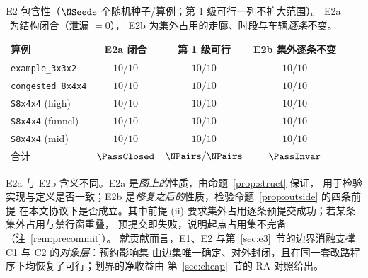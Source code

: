 \begin{table}[t]
\centering
\caption{E2 包含性（\(\NSeeds\) 个随机种子/算例；第 1 级可行一列不扩大范围）。
E2a 为结构闭合（泄漏 \(=0\)），
E2b 为集外占用的走廊、时段与车辆\emph{逐条}不变。}
\label{tab:e2}
\small
\begin{tabular}{@{}lccc@{}}
\toprule
算例 & E2a 闭合 & 第 1 级可行 & E2b 集外逐条不变 \\
\midrule
\texttt{example\_3x3x2}   & \(10/10\) & \(10/10\) & \(10/10\) \\
\texttt{congested\_8x4x4} & \(10/10\) & \(10/10\) & \(10/10\) \\
\texttt{S8x4x4} (high)    & \(10/10\) & \(10/10\) & \(10/10\) \\
\texttt{S8x4x4} (funnel)  & \(10/10\) & \(10/10\) & \(10/10\) \\
\texttt{S8x4x4} (mid)     & \(10/10\) & \(10/10\) & \(10/10\) \\
\midrule
合计 & \(\PassClosed\) & \(\NPairs/\NPairs\) & \(\PassInvar\) \\
\bottomrule
\end{tabular}
\end{table}

E2a 与 E2b 含义不同。E2a 是\emph{图上的}性质，由命题~\ref{prop:struct} 保证，
用于检验实现与定义是否一致；E2b 是\emph{修复之后的}性质，检验命题~\ref{prop:outside} 的四条前提
在本文协议下是否成立。其中前提 (ii) 要求集外占用逐条预提交成功；若某条集外占用与禁行窗重叠，
预提交即失败，说明起点占用集不完备（注~\ref{rem:precommit}）。
就贡献而言，E1、E2 与第~\ref{sec:e3}~节的边界消融支撑 C1 与 C2 的\emph{对象层}：预约影响集
由边集唯一确定、对外封闭，且在同一套改路程序下均恢复了可行；划界的净收益由
第~\ref{sec:cheap}~节的 RA 对照给出。

